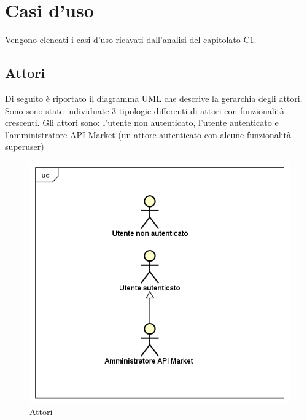 \newpage
\section{Casi d'uso}
Vengono elencati i casi d'uso ricavati dall'analisi del capitolato C1.

\subsection{Attori}
Di seguito è riportato il diagramma UML che descrive la gerarchia degli attori. Sono sono state individuate 3 tipologie differenti di attori con funzionalità crescenti. Gli attori sono: l'utente non autenticato, l'utente autenticato e l'amministratore API Market (un attore autenticato con alcune funzionalità superuser)
\label{Attori}

\begin{figure}[ht]
	\centering
	\includegraphics[scale=0.45]{UML/attori.png}
	\caption{Attori}
\end{figure}


